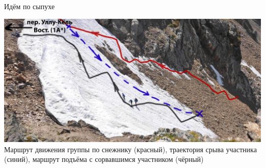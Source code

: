 \begin{frame}
{\begin{minipage}{\fourpicsize}
			Идём по сыпухе		
		\end{minipage}
		\hfill
		\begin{minipage}{\fourpicsize}
			\centering
			\includegraphics[width=\textwidth]{../pics/DSC_0946}			
			Маршрут движения группы по снежнику (красный), траектория срыва участника (синий), маршрут подъёма с сорвавшимся участником (чёрный)
		\end{minipage}
	}
\end{frame}